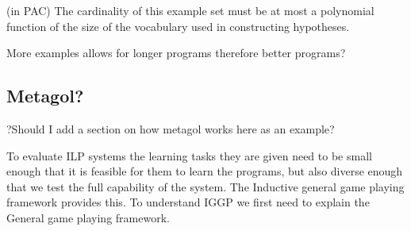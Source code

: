 (in PAC) The cardinality of this example set must be at most a polynomial function of the size of the vocabulary used in constructing hypotheses.

More examples allows for longer programs therefore better programs?



\subsection{Metagol?}
?Should I add a section on how metagol works here as an example?


To evaluate ILP systems the learning tasks they are given need to be small enough that it is feasible for them to learn the programs, but also diverse enough that we test the full capability of the system. The Inductive general game playing framework provides this. To understand IGGP we first need to explain the General game playing framework.



